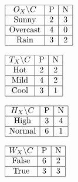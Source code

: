 \documentclass{article}
\theoremstyle{remark}
\begin{document}
	\begin{multicols}{4}
		$\begin{array}{|c|c|c|} \hline
		O_X\backslash C & \text{P} & \text{N}\\\hline
		\text{Sunny} & 2 & 3\\\hline
		\text{Overcast} & 4 & 0\\\hline
		\text{Rain} & 3 & 2\\\hline
		\end{array}$
		\columnbreak
		
		$\begin{array}{|c|c|c|} \hline
		T_X\backslash C & \text{P} & \text{N}\\ \hline
		\text{Hot} & 2 & 2\\ \hline
		\text{Mild} & 4 & 2\\\hline
		\text{Cool} & 3 & 1\\\hline
		\end{array}$
		\columnbreak
		
		$\begin{array}{|c|c|c|}\hline
		H_X\backslash C & \text{P} & \text{N}\\\hline
		\text{High} & 3 & 4\\\hline
		\text{Normal} & 6 & 1\\\hline
		\end{array}$
		\columnbreak
		
		$\begin{array}{|c|c|c|}\hline
		W_X\backslash C & \text{P} & \text{N}\\\hline
		\text{False} & 6 & 2\\\hline
		\text{True} & 3 & 3 \\\hline
		\end{array}$
	\end{multicols}
	
\end{document}
